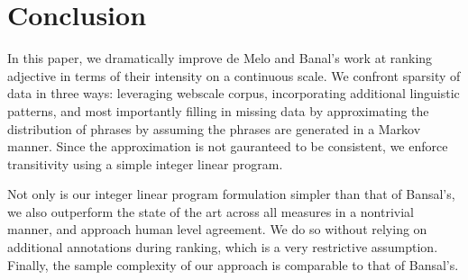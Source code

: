 \section{Conclusion}

In this paper, we dramatically improve de Melo and Banal's work at ranking adjective in terms of their intensity on a continuous scale. We confront sparsity of data in three ways: leveraging webscale corpus, incorporating additional linguistic patterns, and most importantly filling in missing data by approximating the distribution of phrases by assuming the phrases are generated in a Markov manner. Since the approximation is not gauranteed to be consistent, we enforce transitivity using a simple integer linear program. 

Not only is our integer linear program formulation simpler than that of Bansal's, we also outperform the state of the art across all measures in a nontrivial manner, and approach human level agreement. We do so without relying on additional annotations during ranking, which is a very restrictive assumption. Finally, the sample complexity of our approach is comparable to that of Bansal's. 
